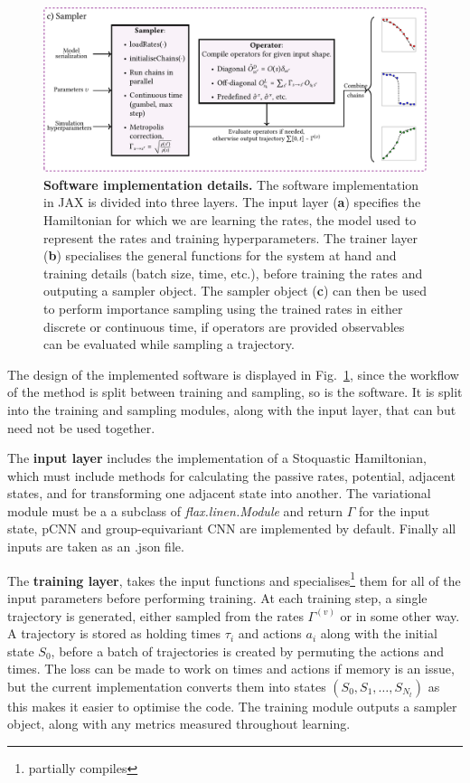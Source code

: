\begin{figure}[t!]
	\ContinuedFloat
	\centering
	\includegraphics[width=\linewidth]{Chapter4/Figs/Vector/qsampl2}
	\caption[Implementation details]{\textbf{Software implementation details.} The software implementation in JAX is divided into three layers. The input layer (\textbf{a}) specifies the Hamiltonian for which we are learning the rates, the model used to represent the rates and training hyperparameters. The trainer layer (\textbf{b}) specialises the general functions for the system at hand and training details (batch size, time, etc.), before training the rates and outputing a sampler object. The sampler object (\textbf{c}) can then be used to perform importance sampling using the trained rates in either discrete or continuous time, if operators are provided observables can be evaluated while sampling a trajectory.}
	\label{fig:qsampl}
\end{figure}
\noindent
The design of the implemented software is displayed in Fig.~\ref{fig:qsampl}, since the workflow of the method is split between training and sampling, so is the software. It is split into the training and sampling modules, along with the input layer, that can but need not be used together.

The \textbf{input layer} includes the implementation of a Stoquastic Hamiltonian, which must include methods for calculating the passive rates, potential, adjacent states, and for transforming one adjacent state into another. The variational module must be a a subclass of \emph{flax.linen.Module} and return $\Gamma$ for the input state, pCNN and group-equivariant CNN are implemented by default. Finally all inputs are taken as an .json file. 

The \textbf{training layer}, takes the input functions and specialises\footnote{partially compiles} them for all of the input parameters before performing training. At each training step, a single trajectory is generated, either sampled from the rates $\Gamma^{(v)}$ or in some other way. A trajectory is stored as holding times $\tau_i$ and actions $a_i$ along with the initial state $S_0$, before a batch of trajectories is created by permuting the actions and times. The loss can be made to work on times and actions if memory is an issue, but the current implementation converts them into states $(S_0, S_1, \ldots, S_{N_t})$ as this makes it easier to optimise the code. The training module outputs a sampler object, along with any metrics measured throughout learning. 

